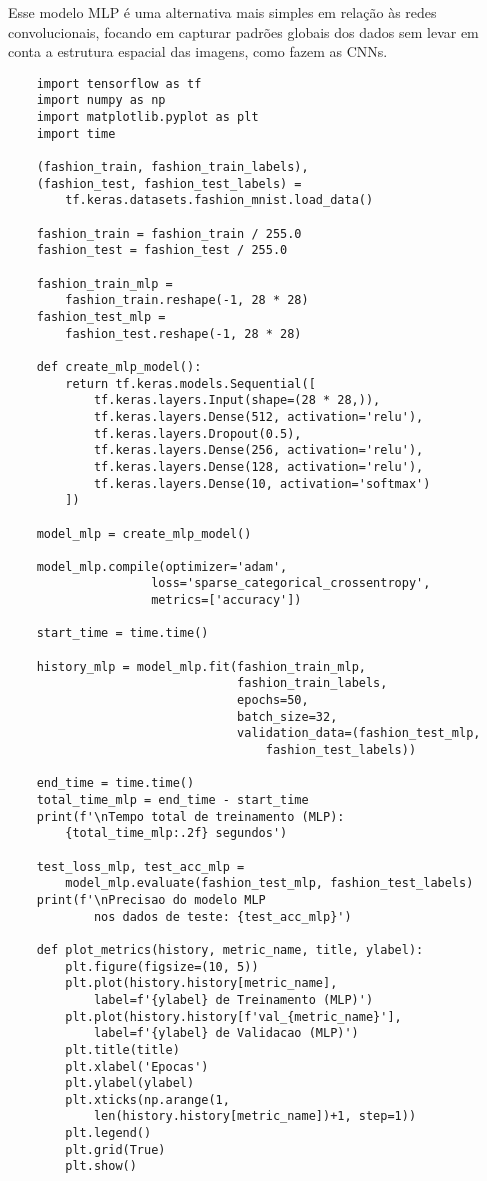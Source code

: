 Esse modelo MLP é uma alternativa mais simples em relação às redes convolucionais, focando em capturar padrões globais dos dados sem levar em conta a estrutura espacial das imagens, como fazem as CNNs.

\begin{lstlisting}
    import tensorflow as tf
    import numpy as np
    import matplotlib.pyplot as plt
    import time

    (fashion_train, fashion_train_labels), 
    (fashion_test, fashion_test_labels) = 
        tf.keras.datasets.fashion_mnist.load_data()

    fashion_train = fashion_train / 255.0
    fashion_test = fashion_test / 255.0

    fashion_train_mlp = 
        fashion_train.reshape(-1, 28 * 28)
    fashion_test_mlp = 
        fashion_test.reshape(-1, 28 * 28)

    def create_mlp_model():
        return tf.keras.models.Sequential([
            tf.keras.layers.Input(shape=(28 * 28,)),
            tf.keras.layers.Dense(512, activation='relu'),
            tf.keras.layers.Dropout(0.5),
            tf.keras.layers.Dense(256, activation='relu'),
            tf.keras.layers.Dense(128, activation='relu'),
            tf.keras.layers.Dense(10, activation='softmax')
        ])

    model_mlp = create_mlp_model()

    model_mlp.compile(optimizer='adam',
                    loss='sparse_categorical_crossentropy',
                    metrics=['accuracy'])

    start_time = time.time()

    history_mlp = model_mlp.fit(fashion_train_mlp, 
                                fashion_train_labels,
                                epochs=50,  
                                batch_size=32,
                                validation_data=(fashion_test_mlp, 
                                    fashion_test_labels))

    end_time = time.time()
    total_time_mlp = end_time - start_time
    print(f'\nTempo total de treinamento (MLP): 
        {total_time_mlp:.2f} segundos')

    test_loss_mlp, test_acc_mlp = 
        model_mlp.evaluate(fashion_test_mlp, fashion_test_labels)
    print(f'\nPrecisao do modelo MLP 
            nos dados de teste: {test_acc_mlp}')

    def plot_metrics(history, metric_name, title, ylabel):
        plt.figure(figsize=(10, 5))
        plt.plot(history.history[metric_name], 
            label=f'{ylabel} de Treinamento (MLP)')
        plt.plot(history.history[f'val_{metric_name}'], 
            label=f'{ylabel} de Validacao (MLP)')
        plt.title(title)
        plt.xlabel('Epocas')
        plt.ylabel(ylabel)
        plt.xticks(np.arange(1, 
            len(history.history[metric_name])+1, step=1))
        plt.legend()
        plt.grid(True)
        plt.show()


\end{lstlisting}
